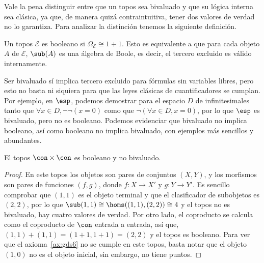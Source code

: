 Vale la pena distinguir entre que un topos sea bivaluado y que su lógica interna sea clásica,
ya que, de manera quizá contraintuitiva, tener dos valores de verdad no lo garantiza. Para analizar la distinción tenemos la siguiente definición.

\begin{definition}
  Un topos $\mathcal{E}$ es booleano si $\Omega_{\mathcal{E}} \cong 1+1$. Esto es equivalente a que para
  cada objeto $A$ de $\mathcal{E}$, $\sub(A)$ es una álgebra de Boole, es decir,
  el tercero excluido es válido internamente.
\end{definition}

Ser bivaluado sí implica tercero excluido para fórmulas sin variables libres, pero esto no basta
ni siquiera para que las leyes clásicas de cuantificadores se cumplan. Por
ejemplo, en $\esp$, podemos
demostrar para el espacio $D$ de infinitesimales tanto que $\forall x\in D, \neg\neg(x=0)$ como que $\neg(\forall x\in D, x=0)$,
por lo que $\esp$ es bivaluado, pero no es booleano. Podemos evidenciar que bivaluado no implica booleano, 
así como booleano no implica bivaluado, con ejemplos más sencillos y abundantes.

\begin{proposition}
  El topos $\con\times  \con$ es booleano y no bivaluado. 
\end{proposition}
\begin{proof}
  En este topos los objetos son pares de conjuntos $(X,Y)$, y los morfismos son pares de funciones 
  $(f,g)$, donde $f\colon X\to X'$ y $g\colon Y\to Y'$. Es sencillo comprobar que $(1,1)$ es el objeto terminal y que
  el clasificador de subobjetos es $(2,2)$, por lo que $\sub(1,1)\cong \homs((1,1),(2,2))\cong 4$ y el topos no es bivaluado,
  hay cuatro valores de verdad. Por otro lado, el coproducto se calcula como el
  coproducto de $\con$
  entrada a entrada,
  así que, $(1,1)+(1,1)=(1+1,1+1)=(2,2)$ y el topos es booleano. Para ver que el axioma~\ref{ax:gds6} no se cumple en este topos, 
  basta notar que el objeto $(1,0)$ no es el objeto inicial, sin embargo, no tiene puntos.
\end{proof}

